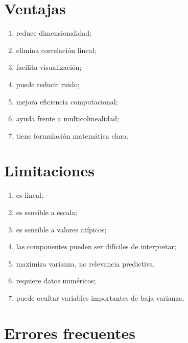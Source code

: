 \documentclass[
  spanish,
  10.5pt,
  letterpaper,
  DIV=11,
  numbers=noendperiod,
  oneside,
  open=any]{scrreprt}
\providecommand{\tightlist}{%
  \setlength{\itemsep}{0pt}\setlength{\parskip}{0pt}}
\theoremstyle{definition}
\theoremstyle{definition}
\theoremstyle{plain}
\theoremstyle{remark}
\begin{document}
\section*{Ventajas}\label{ventajas-4}


\begin{enumerate}
\def\labelenumi{\arabic{enumi}.}
\tightlist
\item
  reduce dimensionalidad;
\item
  elimina correlación lineal;
\item
  facilita visualización;
\item
  puede reducir ruido;
\item
  mejora eficiencia computacional;
\item
  ayuda frente a multicolinealidad;
\item
  tiene formulación matemática clara.
\end{enumerate}

\section*{Limitaciones}\label{limitaciones-4}


\begin{enumerate}
\def\labelenumi{\arabic{enumi}.}
\tightlist
\item
  es lineal;
\item
  es sensible a escala;
\item
  es sensible a valores atípicos;
\item
  las componentes pueden ser difíciles de interpretar;
\item
  maximiza varianza, no relevancia predictiva;
\item
  requiere datos numéricos;
\item
  puede ocultar variables importantes de baja varianza.
\end{enumerate}

\section*{Errores frecuentes}\label{errores-frecuentes-15}

\end{document}
